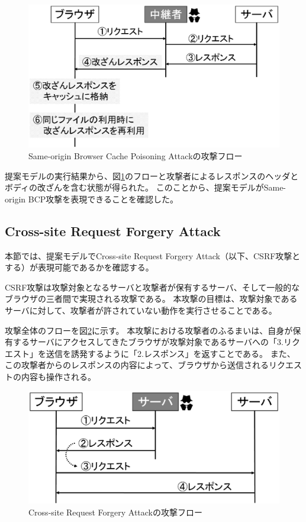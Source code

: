 \documentclass[journal]{IEEEtran}
\begin{document}
\begin{figure}[htb]
\centering
\includegraphics[width=\hsize]{./fig/SameBCP_flow.eps}
\caption{Same-origin Browser Cache Poisoning Attackの攻撃フロー}
\label{fig:SameBCP_flow}
\end{figure}

提案モデルの実行結果から、図\ref{fig:SameBCP_flow}のフローと攻撃者によるレスポンスのヘッダとボディの改ざんを含む状態が得られた。
このことから、提案モデルがSame-origin BCP攻撃を表現できることを確認した。

\subsection{Cross-site Request Forgery Attack}
本節では、提案モデルでCross-site Request Forgery Attack\cite{cookie-model}（以下、CSRF攻撃とする）が表現可能であるかを確認する。

CSRF攻撃は攻撃対象となるサーバと攻撃者が保有するサーバ、そして一般的なブラウザの三者間で実現される攻撃である。
本攻撃の目標は、攻撃対象であるサーバに対して、攻撃者が許されていない動作を実行させることである。

攻撃全体のフローを図\ref{fig:CSRF_flow}に示す。
本攻撃における攻撃者のふるまいは、自身が保有するサーバにアクセスしてきたブラウザが攻撃対象であるサーバへの「3.リクエスト」を送信を誘発するように「2.レスポンス」を返すことである。
また、この攻撃者からのレスポンスの内容によって、ブラウザから送信されるリクエストの内容も操作される。

\begin{figure}[htb]
\centering
\includegraphics[width=\hsize]{./fig/CSRF_flow.eps}
\caption{Cross-site Request Forgery Attackの攻撃フロー}
\label{fig:CSRF_flow}
\end{figure}
\end{document}
